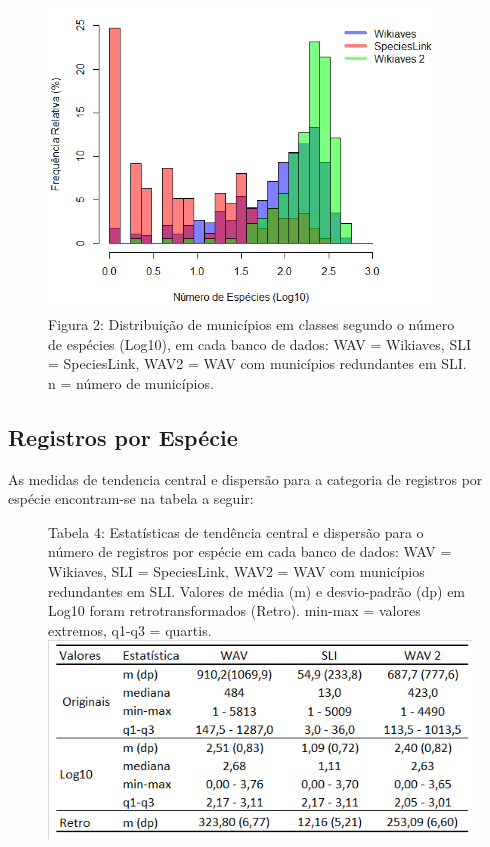 \begin{figure}[h!]
\centering
\includegraphics[height = 8cm]{Imagens/H02.png}
\\{\scriptsize Figura 2: Distribuição de municípios em classes segundo o número de espécies (Log10), em cada banco de dados: WAV = Wikiaves, SLI = SpeciesLink, WAV2 = WAV com municípios redundantes em SLI. n = número de municípios. }
\end{figure}


\subsection{Registros por Espécie}

\begin{resposta}
As medidas de tendencia central e dispersão para a categoria de registros por espécie encontram-se na tabela a seguir: 
\end{resposta}

\newpage

\begin{figure}[h!]
\centering
{\scriptsize Tabela 4: Estatísticas de tendência central e dispersão para o número de registros por espécie em cada banco de dados: WAV = Wikiaves, SLI = SpeciesLink, WAV2 = WAV com municípios redundantes em SLI. Valores de média (m) e desvio-padrão (dp) em Log10 foram retrotransformados (Retro). min-max = valores extremos, q1-q3 = quartis.}
\includegraphics{Imagens/T04.png}
\end{figure}


